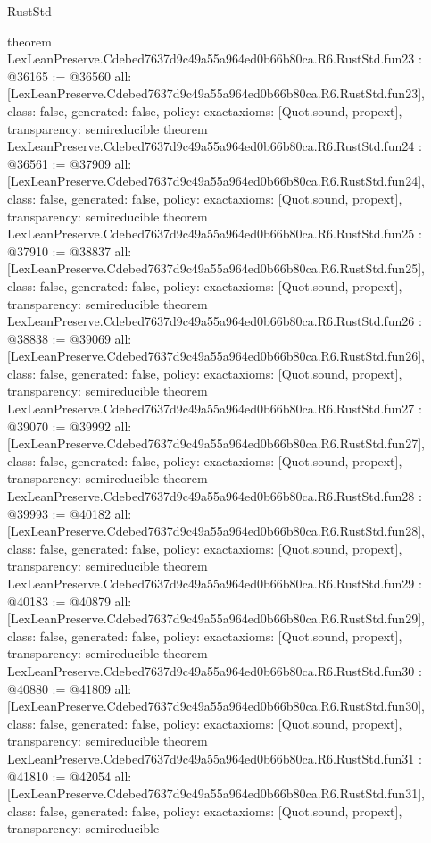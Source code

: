 \begin{lexlean}{RustStd}
\begin{coremodule}
{}
theorem LexLeanPreserve.Cdebed7637d9c49a55a964ed0b66b80ca.R6.RustStd.fun23 : @36165 := @36560 {
  all: [LexLeanPreserve.Cdebed7637d9c49a55a964ed0b66b80ca.R6.RustStd.fun23],
  class: false,
  generated: false,
  policy: exact{axioms: [Quot.sound, propext]},
  transparency: semireducible
}
theorem LexLeanPreserve.Cdebed7637d9c49a55a964ed0b66b80ca.R6.RustStd.fun24 : @36561 := @37909 {
  all: [LexLeanPreserve.Cdebed7637d9c49a55a964ed0b66b80ca.R6.RustStd.fun24],
  class: false,
  generated: false,
  policy: exact{axioms: [Quot.sound, propext]},
  transparency: semireducible
}
theorem LexLeanPreserve.Cdebed7637d9c49a55a964ed0b66b80ca.R6.RustStd.fun25 : @37910 := @38837 {
  all: [LexLeanPreserve.Cdebed7637d9c49a55a964ed0b66b80ca.R6.RustStd.fun25],
  class: false,
  generated: false,
  policy: exact{axioms: [Quot.sound, propext]},
  transparency: semireducible
}
theorem LexLeanPreserve.Cdebed7637d9c49a55a964ed0b66b80ca.R6.RustStd.fun26 : @38838 := @39069 {
  all: [LexLeanPreserve.Cdebed7637d9c49a55a964ed0b66b80ca.R6.RustStd.fun26],
  class: false,
  generated: false,
  policy: exact{axioms: [Quot.sound, propext]},
  transparency: semireducible
}
theorem LexLeanPreserve.Cdebed7637d9c49a55a964ed0b66b80ca.R6.RustStd.fun27 : @39070 := @39992 {
  all: [LexLeanPreserve.Cdebed7637d9c49a55a964ed0b66b80ca.R6.RustStd.fun27],
  class: false,
  generated: false,
  policy: exact{axioms: [Quot.sound, propext]},
  transparency: semireducible
}
theorem LexLeanPreserve.Cdebed7637d9c49a55a964ed0b66b80ca.R6.RustStd.fun28 : @39993 := @40182 {
  all: [LexLeanPreserve.Cdebed7637d9c49a55a964ed0b66b80ca.R6.RustStd.fun28],
  class: false,
  generated: false,
  policy: exact{axioms: [Quot.sound, propext]},
  transparency: semireducible
}
theorem LexLeanPreserve.Cdebed7637d9c49a55a964ed0b66b80ca.R6.RustStd.fun29 : @40183 := @40879 {
  all: [LexLeanPreserve.Cdebed7637d9c49a55a964ed0b66b80ca.R6.RustStd.fun29],
  class: false,
  generated: false,
  policy: exact{axioms: [Quot.sound, propext]},
  transparency: semireducible
}
theorem LexLeanPreserve.Cdebed7637d9c49a55a964ed0b66b80ca.R6.RustStd.fun30 : @40880 := @41809 {
  all: [LexLeanPreserve.Cdebed7637d9c49a55a964ed0b66b80ca.R6.RustStd.fun30],
  class: false,
  generated: false,
  policy: exact{axioms: [Quot.sound, propext]},
  transparency: semireducible
}
theorem LexLeanPreserve.Cdebed7637d9c49a55a964ed0b66b80ca.R6.RustStd.fun31 : @41810 := @42054 {
  all: [LexLeanPreserve.Cdebed7637d9c49a55a964ed0b66b80ca.R6.RustStd.fun31],
  class: false,
  generated: false,
  policy: exact{axioms: [Quot.sound, propext]},
  transparency: semireducible
}
\end{coremodule}
\end{lexlean}
